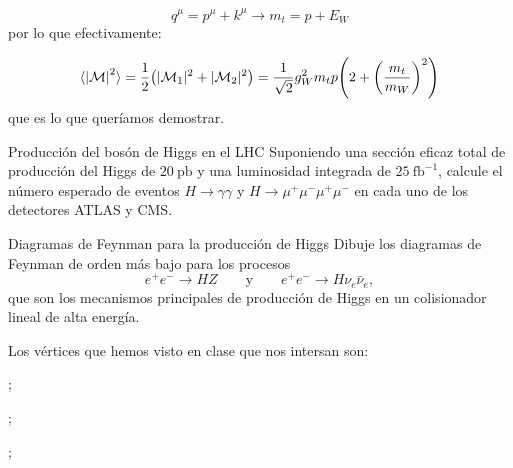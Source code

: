 \begin{equation}
	q^\mu = p^\mu + k^\mu \longrightarrow  m_t = p+E_W
\end{equation}
por lo que efectivamente: 

\begin{equation}
	\langle \vqty{\Mcal}^2 \rangle = \frac{1}{2} \pqty{|\Mcal_1|^2 + |\Mcal_2|^2} = \frac{1}{\sqrt{2}}g_W^2 m_t p \pqty{2+\pqty{\frac{m_t}{m_W}}^2}
\end{equation}
que es lo que queríamos demostrar. 


\begin{Ejercicio}{Producción del bosón de Higgs en el LHC}\label{Ej:23}
Suponiendo una sección eficaz total de producción del Higgs de $20~\text{pb}$ y una luminosidad integrada de $25~\text{fb}^{-1}$,
calcule el número esperado de eventos $H \to \gamma\gamma$ y $H \to \mu^+\mu^-\mu^+\mu^-$ en cada uno de los detectores ATLAS y CMS.
\end{Ejercicio}



\begin{Ejercicio}{Diagramas de Feynman para la producción de Higgs}\label{Ej:24}
Dibuje los diagramas de Feynman de orden más bajo para los procesos
\[
e^+ e^- \to HZ 
\qquad \text{y} \qquad
e^+ e^- \to H\nu_e \bar{\nu}_e,
\]
que son los mecanismos principales de producción de Higgs en un colisionador lineal de alta energía.
\end{Ejercicio}

Los vértices que hemos visto en clase que nos intersan son: 

\begin{minipage}{0.33\linewidth}	
\centering
	;
\end{minipage}
\begin{minipage}{0.33\linewidth}	
\centering
	;
\end{minipage}
\begin{minipage}{0.33\linewidth}	
\centering
	;
\end{minipage}

